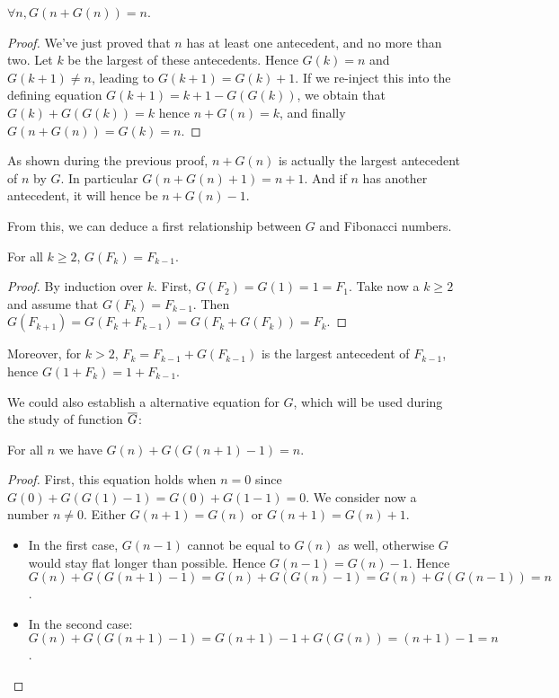 \documentclass[a4paper,11pt]{article}
\begin{document}
\begin{theorem}\label{Gonto}
$\forall n, G(n+G(n))=n$.
\end{theorem}
\begin{proof}
We've just proved that $n$ has at least one antecedent, and
no more than two. Let $k$ be the largest of these antecedents.
Hence $G(k)=n$ and $G(k+1)\neq n$, leading to $G(k+1)=G(k)+1$.
If we re-inject this into the defining equation $G(k+1) = k+1 -
G(G(k))$, we obtain that $G(k)+G(G(k))=k$ hence $n+G(n)=k$,
and finally $G(n+G(n))=G(k)=n$.
\end{proof}

As shown during the previous proof, $n+G(n)$ is actually the largest antecedent
of $n$ by $G$. In particular $G(n+G(n)+1)=n+1$. And if $n$ has another
antecedent, it will hence be $n+G(n)-1$.

From this, we can deduce a first relationship between $G$ and
Fibonacci numbers.
\begin{theorem}\label{Gfib} For all $k\ge 2$, $G(F_k)=F_{k-1}$.
\end{theorem}
\begin{proof}By induction over $k$. First, $G(F_2)=G(1)=1=F_1$.
Take now a $k\ge 2$ and assume that $G(F_k)=F_{k-1}$.
Then $G(F_{k+1})=G(F_k+F_{k-1})=G(F_k+G(F_k))=F_k$.
\end{proof}

Moreover, for $k>2$, $F_k = F_{k-1}+G(F_{k-1})$ is the largest antecedent of
$F_{k-1}$, hence $G(1+F_k)=1+F_{k-1}$.

We could also establish a alternative equation for $G$, which will be
used during the study of function $\overline{G}$:

\begin{theorem}\label{Galt} For all $n$ we have $G(n) + G(G(n+1)-1) = n$.
\end{theorem}
\begin{proof}
First, this equation holds when $n=0$ since
$G(0)+G(G(1)-1) = G(0) + G(1-1) = 0$.
We consider now a number $n\neq 0$. Either $G(n+1)=G(n)$ or $G(n+1)=G(n)+1$.
\begin{itemize}
\item In the first case, $G(n-1)$ cannot be equal to $G(n)$ as well,
otherwise $G$ would stay flat longer than possible. Hence $G(n-1)=G(n)-1$.
Hence $G(n)+G(G(n+1)-1) = G(n) + G(G(n)-1) = G(n)+G(G(n-1)) = n$.
\item In the second case:
$G(n) + G(G(n+1)-1) = G(n+1)-1 + G(G(n)) = (n+1)-1 = n$.
\end{itemize}
\end{proof}
\end{document}

